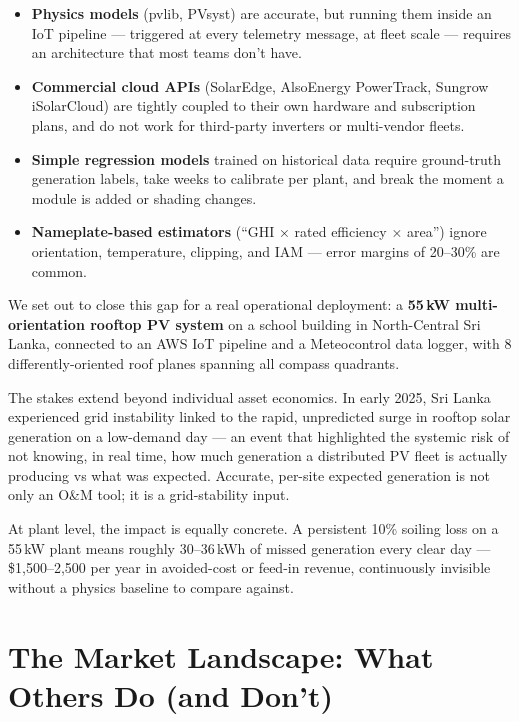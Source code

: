 \documentclass[11pt, a4paper]{article}
\begin{document}
\begin{itemize}
  \item \textbf{Physics models} (pvlib, PVsyst) are accurate, but running
    them inside an IoT pipeline --- triggered at every telemetry message, at
    fleet scale --- requires an architecture that most teams don't have.
  \item \textbf{Commercial cloud APIs} (SolarEdge, AlsoEnergy PowerTrack,
    Sungrow iSolarCloud) are tightly coupled to their own hardware and
    subscription plans, and do not work for third-party inverters or
    multi-vendor fleets.
  \item \textbf{Simple regression models} trained on historical data require
    ground-truth generation labels, take weeks to calibrate per plant, and
    break the moment a module is added or shading changes.
  \item \textbf{Nameplate-based estimators} (``GHI × rated efficiency × area'')
    ignore orientation, temperature, clipping, and IAM --- error margins of
    20--30\% are common.
\end{itemize}

We set out to close this gap for a real operational deployment:
a \textbf{55\,kW multi-orientation rooftop PV system} on a school building
in North-Central Sri Lanka, connected to an AWS IoT pipeline and a Meteocontrol
data logger, with 8 differently-oriented roof planes spanning all compass
quadrants.

The stakes extend beyond individual asset economics. In early 2025, Sri Lanka
experienced grid instability linked to the rapid, unpredicted surge in rooftop
solar generation on a low-demand day --- an event that highlighted the systemic
risk of not knowing, in real time, how much generation a distributed PV fleet
is actually producing vs what was expected. Accurate, per-site expected
generation is not only an O\&M tool; it is a grid-stability input.

At plant level, the impact is equally concrete. A persistent 10\% soiling
loss on a 55\,kW plant means roughly 30--36\,kWh of missed generation every
clear day --- \$1{,}500--2{,}500 per year in avoided-cost or feed-in revenue,
continuously invisible without a physics baseline to compare against.

\section{The Market Landscape: What Others Do (and Don't)}
\end{document}
